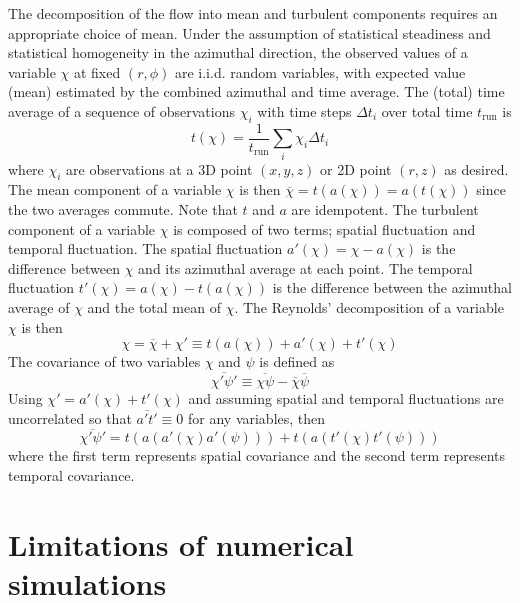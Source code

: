 \documentclass[a4paper]{article}
\begin{document}
The decomposition of the flow into mean and turbulent components requires an appropriate choice of mean. Under
the assumption of statistical steadiness and statistical homogeneity in the azimuthal direction, the observed
values of a variable $\chi$ at fixed $(r,\phi)$ are i.i.d. random variables, with expected value (mean)
estimated by the combined azimuthal and time average. The (total) time average of a sequence of observations
$\chi_i$ with time steps $\Delta t_i$ over total time $t_{\text{run}}$ is
\begin{equation}
	t(\chi) = \frac{1}{t_{\text{run}}} \sum_i \chi_i \Delta t_i
\end{equation}
where $\chi_i$ are observations at a 3D point $(x,y,z)$ or 2D point $(r,z)$ as desired. The mean component
of a variable $\chi$ is then $\overline{\chi} = t(a(\chi)) = a(t(\chi))$ since the two averages commute. Note
that $t$ and $a$ are idempotent. The turbulent component of a variable $\chi$ is composed of two terms;
spatial fluctuation and temporal fluctuation. The spatial fluctuation $a'(\chi) = \chi - a(\chi)$ is the
difference between $\chi$ and its azimuthal average at each point. The temporal fluctuation $t'(\chi) =
a(\chi) - t(a(\chi))$ is the difference between the azimuthal average of $\chi$ and the total mean of $\chi$.
The Reynolds' decomposition of a variable $\chi$ is then
\begin{equation}
	\chi = \overline{\chi} + \chi' \equiv t(a(\chi)) + a'(\chi) + t'(\chi)
\end{equation}
The covariance of two variables $\chi$ and $\psi$ is defined as
\begin{equation}
	\overline{\chi' \psi'} \equiv \overline{\chi\psi} - \overline{\chi}\overline{\psi}
\end{equation}
Using $\chi' = a'(\chi) + t'(\chi)$ and assuming spatial and temporal fluctuations are uncorrelated so that
$\overline{a't'} \equiv 0$ for any variables, then
\begin{equation}
	\overline{\chi' \psi'} = t(a(a'(\chi)a'(\psi))) + t(a(t'(\chi)t'(\psi)))
\end{equation}
where the first term represents spatial covariance and the second term represents temporal covariance.

\section{Limitations of numerical simulations}
\label{app:limitations}
\end{document}
